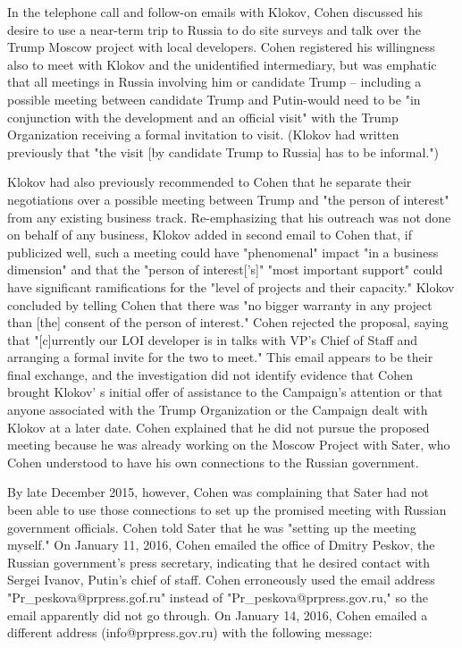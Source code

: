 In the telephone call and follow-on emails with Klokov, Cohen discussed his desire to use a near-term trip to Russia to do site surveys and talk over the Trump Moscow project with local developers.
Cohen registered his willingness also to meet with Klokov and the unidentified intermediary, but was emphatic that all meetings in Russia involving him or candidate Trump -- including a possible meeting between candidate Trump and Putin-would need to be "in conjunction with the development and an official visit" with the Trump Organization receiving a formal invitation to visit.
(Klokov had written previously that "the visit [by candidate Trump to Russia] has to be informal.")

Klokov had also previously recommended to Cohen that he separate their negotiations over a possible meeting between Trump and "the person of interest" from any existing business track.
Re-emphasizing that his outreach was not done on behalf of any business, Klokov added in second email to Cohen that, if publicized well, such a meeting could have "phenomenal" impact "in a business dimension" and that the "person of interest['s]" "most important support" could have significant ramifications for the "level of projects and their capacity."
Klokov concluded by telling Cohen that there was "no bigger warranty in any project than [the] consent of the person of interest."
Cohen rejected the proposal, saying that "[c]urrently our LOI developer is in talks with VP's Chief of Staff and arranging a formal invite for the two to meet."
This email appears to be their final exchange, and the investigation did not identify evidence that Cohen brought Klokov' s initial offer of assistance to the Campaign's attention or that anyone associated with the Trump Organization or the Campaign dealt with Klokov at a later date.
Cohen explained that he did not pursue the proposed meeting because he was already working on the Moscow Project with Sater, who Cohen understood to have his own connections to the Russian government.

By late December 2015, however, Cohen was complaining that Sater had not been able to use those connections to set up the promised meeting with Russian government officials.
Cohen told Sater that he was "setting up the meeting myself."%
On January 11, 2016,  Cohen emailed the office of Dmitry Peskov, the Russian government's press secretary, indicating that he desired contact with Sergei Ivanov,  Putin's chief of staff.
Cohen erroneously used the email address "Pr_peskova@prpress.gof.ru" instead of "Pr_peskova@prpress.gov.ru," so the email apparently did not go through.%
On January 14, 2016, Cohen emailed a different address (info@prpress.gov.ru) with the following message:

